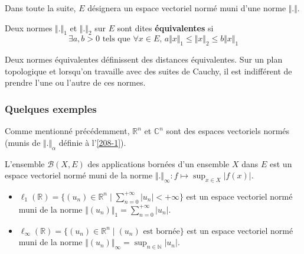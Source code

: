   Dans toute la suite, $E$ désignera un espace vectoriel normé muni d'une norme $\Vert . \Vert$.

  \begin{definition}
    Deux normes $\Vert . \Vert_1$ et $\Vert . \Vert_2$ sur $E$ sont dites \textbf{équivalentes} si
    \[ \exists a, b > 0 \text{ tels que } \forall x \in E, \, a \Vert x \Vert_1 \leq \Vert x \Vert_2 \leq b \Vert x \Vert_1 \]
  \end{definition}

  \begin{remark}
    Deux normes équivalentes définissent des distances équivalentes. Sur un plan topologique et lorsqu'on travaille avec des suites de Cauchy, il est indifférent de prendre l'une ou l'autre de ces normes.
  \end{remark}

  \subsubsection{Quelques exemples}

  \begin{example}
    Comme mentionné précédemment, $\mathbb{R}^n$ et $\mathbb{C}^n$ sont des espaces vectoriels normés (munis de $\Vert . \Vert_\alpha$ définie à l'\cref{208-1}).
  \end{example}


  \begin{example}
    L'ensemble $\mathcal{B}(X,E)$ des applications bornées d'un ensemble $X$ dans $E$ est un espace vectoriel normé muni de la norme $\Vert . \Vert_\infty : f \mapsto \sup_{x \in X} \vert f(x) \vert$.
  \end{example}


  \begin{example}
    \begin{itemize}
      \item $\ell_1(\mathbb{R}) = \{ (u_n) \in \mathbb{R}^n \mid \sum_{n=0}^{+\infty} \vert u_n \vert < +\infty \}$ est un espace vectoriel normé muni de la norme $\Vert (u_n) \Vert_1 = \sum_{n=0}^{+\infty} \vert u_n \vert$.
      \item $\ell_\infty(\mathbb{R}) = \{ (u_n) \in \mathbb{R}^n \mid (u_n) \text{ est bornée} \}$ est un espace vectoriel normé muni de la norme $\Vert (u_n) \Vert_\infty = \sup_{n \in \mathbb{N}} \vert u_n \vert$.
    \end{itemize}
  \end{example}

